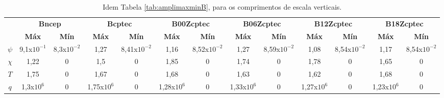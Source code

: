 \begin{table}[H]
\caption{Idem Tabela \ref{tab:amplimaxminB}, para os comprimentos de escala verticais.}
\begin{center}
\begin{adjustbox}{max width=\textwidth}
\begin{tabular}{ccccccccccccc}
\toprule
\toprule
\multicolumn{1}{c}{} & \multicolumn{2}{c}{\textbf{Bncep}} & \multicolumn{2}{c}{\textbf{Bcptec}} & \multicolumn{2}{c}{\textbf{B00Zcptec}} &\multicolumn{2}{c}{\textbf{B06Zcptec}} & \multicolumn{2}{c}{\textbf{B12Zcptec}} & \multicolumn{2}{c}{\textbf{B18Zcptec}} \\
\cmidrule(lr){2-3} \cmidrule(lr){4-5} \cmidrule(lr){6-7} \cmidrule(lr){8-9} \cmidrule(lr){10-11} \cmidrule(lr){12-13}
\multicolumn{1}{c}{} & \multicolumn{1}{c}{\textbf{Máx}} & \multicolumn{1}{c}{\textbf{Mín}} & \multicolumn{1}{c}{\textbf{Máx}} & \multicolumn{1}{c}{\textbf{Mín}} & \multicolumn{1}{c}{\textbf{Máx}} & \multicolumn{1}{c}{\textbf{Mín}} & \multicolumn{1}{c}{\textbf{Máx}} & \multicolumn{1}{c}{\textbf{Mín}} & \multicolumn{1}{c}{\textbf{Máx}} & \multicolumn{1}{c}{\textbf{Mín}} & \multicolumn{1}{c}{\textbf{Máx}} & \multicolumn{1}{c}{\textbf{Mín}} \\
\midrule
\multicolumn{1}{c}{$\psi$} & \multicolumn{1}{c}{9,1x$10^{-1}$} & \multicolumn{1}{c}{8,3x$10^{-2}$} & \multicolumn{1}{c}{1,27} & \multicolumn{1}{c}{8,41x$10^{-2}$} & \multicolumn{1}{c}{1,16} & \multicolumn{1}{c}{8,52x$10^{-2}$} & \multicolumn{1}{c}{1,27} & \multicolumn{1}{c}{8,59x$10^{-2}$} & \multicolumn{1}{c}{1,08} & \multicolumn{1}{c}{8,54x$10^{-2}$} & \multicolumn{1}{c}{1,17} & \multicolumn{1}{c}{8,54x$10^{-2}$} \\ 
\multicolumn{1}{c}{$\chi$} & \multicolumn{1}{c}{1,22} & \multicolumn{1}{c}{0} & \multicolumn{1}{c}{1,5} & \multicolumn{1}{c}{0} & \multicolumn{1}{c}{1,85} & \multicolumn{1}{c}{0} & \multicolumn{1}{c}{1,74} & \multicolumn{1}{c}{0} & \multicolumn{1}{c}{1,78} & \multicolumn{1}{c}{0} & \multicolumn{1}{c}{1,65} & \multicolumn{1}{c}{0} \\ 
\multicolumn{1}{c}{$T$}    & \multicolumn{1}{c}{1,75} & \multicolumn{1}{c}{0} & \multicolumn{1}{c}{1,67} & \multicolumn{1}{c}{0} & \multicolumn{1}{c}{1,68} & \multicolumn{1}{c}{0} & \multicolumn{1}{c}{1,63} & \multicolumn{1}{c}{0} & \multicolumn{1}{c}{1,62} & \multicolumn{1}{c}{0} & \multicolumn{1}{c}{1,68} & \multicolumn{1}{c}{0} \\ 
\multicolumn{1}{c}{$q$}    & \multicolumn{1}{c}{1,3x$10^{6}$} & \multicolumn{1}{c}{0} & \multicolumn{1}{c}{1,75x$10^{6}$} & \multicolumn{1}{c}{0} & \multicolumn{1}{c}{1,28x$10^{6}$} & \multicolumn{1}{c}{0} & \multicolumn{1}{c}{1,33x$10^{6}$} & \multicolumn{1}{c}{0} & \multicolumn{1}{c}{1,27x$10^{6}$} & \multicolumn{1}{c}{0} & \multicolumn{1}{c}{1,23x$10^{6}$} & \multicolumn{1}{c}{0} \\ 

\end{tabular}
\end{adjustbox}
\end{center}
\end{table}
